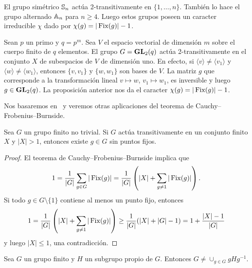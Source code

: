 \begin{example}
    El grupo simétrico $\mathbb{S}_n$ actúa 2-transitivamente en $\{1,\dots,n\}$. También lo hace el grupo 
    alternado $\mathbb{A}_n$ para $n\geq4$. Luego estos grupos poseen un caracter irreducible $\chi$ 
    dado por $\chi(g)=|\operatorname{Fix}(g)|-1$.
\end{example}

\begin{example}
    Sean $p$ un primo y $q=p^{m}$. Sea $V$ el espacio vectorial de dimensión $m$ sobre el cuerpo finito de $q$ elementos. 
    El grupo $G=\mathbf{GL}_2(q)$ actúa 2-transitivamente en el conjunto $X$ de subespacios de $V$ de dimensión uno. En efecto,
    si $\langle v\rangle\ne\langle v_1\rangle$ y $\langle w\rangle\ne\langle w_1\rangle$, 
    entonces $\{v,v_1\}$ y $\{w,w_1\}$ son bases de $V$. 
    La matriz $g$ que corresponde a la transformación lineal $v\mapsto w$, $v_1\mapsto w_1$, es inversible y luego $g\in\mathbf{GL}_2(q)$. 
    La proposición anterior nos da el caracter $\chi(g)=|\operatorname{Fix}(g)|-1$. 
\end{example}

Nos basaremos en~\cite{MR1997347} y veremos otras aplicaciones del teorema de Cauchy--Frobenius--Burnside. 

\begin{theorem}[Jordan]
Sea $G$ un grupo finito no trivial. Si $G$ actúa transitivamente en un conjunto finito $X$ y $|X|>1$, entonces
existe $g\in G$ sin puntos fijos. 
\end{theorem}

\begin{proof}
El teorema de Cauchy--Frobenius--Burnside implica que
\[
1=\frac{1}{|G|}\sum_{g\in G}|\operatorname{Fix}(g)|=\frac{1}{|G|}\left(|X|+\sum_{g\ne 1}|\operatorname{Fix}(g)|\right).
\]
Si todo $g\in G\setminus\{1\}$ contiene al menos un punto fijo, entonces
\[
1=\frac{1}{|G|}\left(|X|+\sum_{g\ne 1}|\operatorname{Fix}(g)|\right)\geq \frac{1}{|G|}(|X|+|G|-1)=1+\frac{|X|-1}{|G|}
\]
y luego $|X|\leq1$, una contradicción. 
\end{proof}

\begin{corollary}
Sea $G$ un grupo finito y $H$ un subgrupo propio de $G$. Entonces $G\ne\cup_{g\in G}gHg^{-1}$.
\end{corollary}

